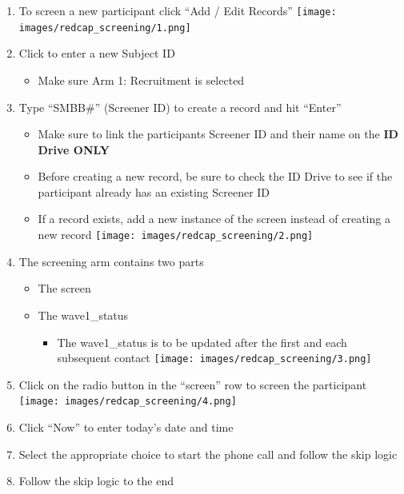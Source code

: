 \documentclass[
]{book}
\providecommand{\tightlist}{%
  \setlength{\itemsep}{0pt}\setlength{\parskip}{0pt}}
\begin{document}
\begin{enumerate}
\def\labelenumi{\arabic{enumi}.}
\tightlist
\item
  To screen a new participant click ``Add / Edit Records''
  \texttt{[image: images/redcap\_screening/1.png]}
\item
  Click to enter a new Subject ID

  \begin{itemize}
  \tightlist
  \item
    Make sure Arm 1: Recruitment is selected
  \end{itemize}
\item
  Type ``SMBB\#'' (Screener ID) to create a record and hit ``Enter''

  \begin{itemize}
  \tightlist
  \item
    Make sure to link the participants Screener ID and their name on the \textbf{ID Drive ONLY}
  \item
    Before creating a new record, be sure to check the ID Drive to see if the participant already has an existing Screener ID
  \item
    If a record exists, add a new instance of the screen instead of creating a new record
    \texttt{[image: images/redcap\_screening/2.png]}
  \end{itemize}
\item
  The screening arm contains two parts

  \begin{itemize}
  \tightlist
  \item
    The screen
  \item
    The wave1\_status

    \begin{itemize}
    \tightlist
    \item
      The wave1\_status is to be updated after the first and each subsequent contact
      \texttt{[image: images/redcap\_screening/3.png]}
    \end{itemize}
  \end{itemize}
\item
  Click on the radio button in the ``screen'' row to screen the participant
  \texttt{[image: images/redcap\_screening/4.png]}
\item
  Click ``Now'' to enter today's date and time
\item
  Select the appropriate choice to start the phone call and follow the skip logic
\item
  Follow the skip logic to the end


\end{enumerate}
\end{document}
